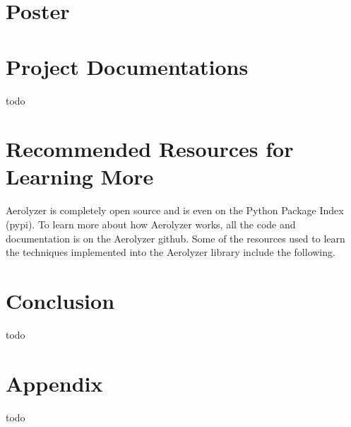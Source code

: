 \documentclass[onecolumn, draftclsnofoot,10pt, compsoc]{IEEEtran}
\begin{document}
\begin{singlespace}
	\section{Poster}
		
	\section{Project Documentations}
		todo
	\section{Recommended Resources for Learning More}
		Aerolyzer is completely open source and is even on the Python Package Index (pypi).
		To learn more about how Aerolyzer works, all the code and documentation is on the Aerolyzer github.
		Some of the resources used to learn the techniques implemented into the Aerolyzer library include the following.
		
	\section{Conclusion}
		todo \cite{neural}
	\section{Appendix}
		todo
\end{singlespace}
\clearpage


\end{document}
